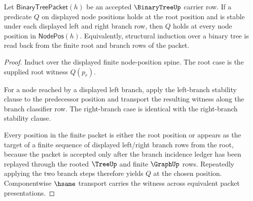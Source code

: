 \begin{theorem}
\label{thm:binary-tree-induction-readback}
Let $\mathsf{BinaryTreePacket}(h)$ be an accepted $\BinaryTreeUp$ carrier row. If a predicate $Q$ on displayed node positions holds at the root position and is stable under each displayed left and right branch row, then $Q$ holds at every node position in $\mathsf{NodePos}(h)$. Equivalently, structural induction over a binary tree is read back from the finite root and branch rows of the packet.
\end{theorem}
\begin{proof}
Induct over the displayed finite node-position spine. The root case is the supplied root witness $Q(p_r)$.

For a node reached by a displayed left branch, apply the left-branch stability clause to the predecessor position and transport the resulting witness along the branch classifier row. The right-branch case is identical with the right-branch stability clause.

Every position in the finite packet is either the root position or appears as the target of a finite sequence of displayed left/right branch rows from the root, because the packet is accepted only after the branch incidence ledger has been replayed through the rooted $\TreeUp$ and finite $\GraphUp$ rows. Repeatedly applying the two branch steps therefore yields $Q$ at the chosen position. Componentwise $\hsame$ transport carries the witness across equivalent packet presentations.
\end{proof}

\begin{closurestatus}{\BinaryTreeUp}
  \theoryclosure{\seedClosure}
  \formalstatus{\unformalizedV}
\end{closurestatus}
